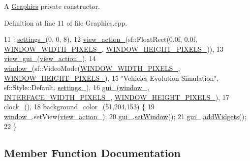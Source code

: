 A \hyperlink{classGraphics}{Graphics} private constructor. 



Definition at line 11 of file Graphics.\+cpp.


\begin{DoxyCode}
11                    : \hyperlink{classGraphics_ab8d68b2977c39547e1c10a7669698aca}{settings\_}(0, 0, 8),
12                        \hyperlink{classGraphics_a60792a296f5e93dbd1d086398e20cbd0}{view\_action\_}(sf::FloatRect(0.0f, 0.0f, 
      \hyperlink{classGraphics_a4e8cd4a9f4799e3b7f5e85685d6d4905}{WINDOW\_WIDTH\_PIXELS\_}, \hyperlink{classGraphics_a2838b79511d56711b88e677ad48c54e9}{WINDOW\_HEIGHT\_PIXELS\_})),
13                        \hyperlink{classGraphics_aaca5b237fae17f3166f8f28e4c363e06}{view\_gui\_}(\hyperlink{classGraphics_a60792a296f5e93dbd1d086398e20cbd0}{view\_action\_}),
14                        \hyperlink{classGraphics_ac760fe1abb0b648844c9f15afa087ef6}{window\_}(sf::VideoMode(\hyperlink{classGraphics_a4e8cd4a9f4799e3b7f5e85685d6d4905}{WINDOW\_WIDTH\_PIXELS\_}, 
      \hyperlink{classGraphics_a2838b79511d56711b88e677ad48c54e9}{WINDOW\_HEIGHT\_PIXELS\_}),
15                                \textcolor{stringliteral}{"Vehicles Evolution Simulation"}, sf::Style::Default, 
      \hyperlink{classGraphics_ab8d68b2977c39547e1c10a7669698aca}{settings\_}),
16                        \hyperlink{classGraphics_ac582857f6b0de010eabd0146c4a5f4d2}{gui\_}(\hyperlink{classGraphics_ac760fe1abb0b648844c9f15afa087ef6}{window\_}, \hyperlink{classGraphics_aac15ea113ea8c69d5e54996513886110}{INTERFACE\_WIDTH\_PIXELS\_}, 
      \hyperlink{classGraphics_a2838b79511d56711b88e677ad48c54e9}{WINDOW\_HEIGHT\_PIXELS\_}),
17                        \hyperlink{classGraphics_ad9850d50fe5792666c8aea88f39ba99c}{clock\_}(),
18                        \hyperlink{classGraphics_a44d7a76a58e03b8ad3f025123894c526}{background\_color\_}(51,204,153) \{
19     \hyperlink{classGraphics_ac760fe1abb0b648844c9f15afa087ef6}{window\_}.setView(\hyperlink{classGraphics_a60792a296f5e93dbd1d086398e20cbd0}{view\_action\_});
20     \hyperlink{classGraphics_ac582857f6b0de010eabd0146c4a5f4d2}{gui\_}.\hyperlink{classGraphicalUserInterface_a9dc5f335b77be5a4d871926155afb8dd}{setWindow}();
21     \hyperlink{classGraphics_ac582857f6b0de010eabd0146c4a5f4d2}{gui\_}.\hyperlink{classGraphicalUserInterface_a48e6dcc9acc179fdb74e67a51d66efb7}{addWidgets}();
22 \}
\end{DoxyCode}


\subsection{Member Function Documentation}
\mbox{\label{classGraphics_ad0e7c12771870690d603e9df6643542c}} 
